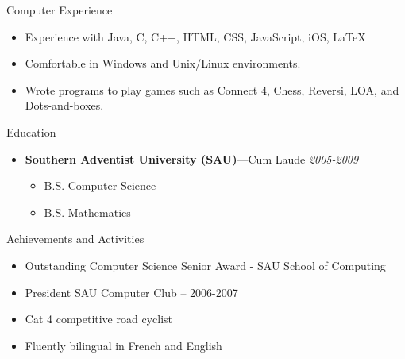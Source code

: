 \documentclass[11pt,oneside]{article}
\newenvironment{ressection}[1]{
	\vspace{4pt}
	{\fontfamily{phv}\selectfont\Large#1}
	\begin{itemize}
	\vspace{3pt}
}{
	\end{itemize}
}
\newcommand{\resitem}[1]{
	\vspace{-4pt}
	\item \begin{flushleft} #1 \end{flushleft}
}
\newcommand{\resbigitem}[3]{
	\vspace{-5pt}
	\item
	{\textbf{#1}---#2 \hfill \textit{#3}}
}
\newenvironment{restitledposition}[3]{
	\resbigitem{#1}{#2}{#3}
	\vspace{-2pt}
	\begin{itemize}
}{
	\end{itemize}
}
\begin{document}
\begin{ressection}{Computer Experience}
  \resitem{Experience with Java, C, C++, HTML, CSS, JavaScript, iOS, \LaTeX}
  \resitem{Comfortable in Windows and Unix/Linux environments.}
  \resitem{Wrote programs to play games such as Connect 4, Chess, Reversi, LOA, and Dots-and-boxes.}
\end{ressection}

\begin{ressection}{Education}
	\begin{restitledposition}{Southern Adventist University (SAU)}{Cum Laude}{2005-2009}
		\resitem{B.S. Computer Science}
		\resitem{B.S. Mathematics}
	\end{restitledposition}
\end{ressection}


\begin{ressection}{Achievements and Activities}

	\resitem{Outstanding Computer Science Senior Award - SAU School of Computing}
	\resitem{President SAU Computer Club -- 2006-2007}
	\resitem{Cat 4 competitive road cyclist}
  \resitem{Fluently bilingual in French and English}

\end{ressection}
\end{document}

